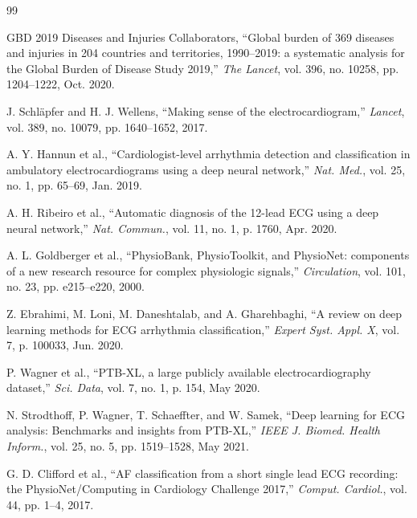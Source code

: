 \documentclass[12pt,a4paper]{report}
\begin{document}
\begin{thebibliography}{99}

GBD 2019 Diseases and Injuries Collaborators, ``Global burden of 369 diseases and injuries in 204 countries and territories, 1990--2019: a systematic analysis for the Global Burden of Disease Study 2019,'' \textit{The Lancet}, vol. 396, no. 10258, pp. 1204--1222, Oct. 2020.

J. Schläpfer and H. J. Wellens, ``Making sense of the electrocardiogram,'' \textit{Lancet}, vol. 389, no. 10079, pp. 1640--1652, 2017.

A. Y. Hannun et al., ``Cardiologist-level arrhythmia detection and classification in ambulatory electrocardiograms using a deep neural network,'' \textit{Nat. Med.}, vol. 25, no. 1, pp. 65--69, Jan. 2019.

A. H. Ribeiro et al., ``Automatic diagnosis of the 12-lead ECG using a deep neural network,'' \textit{Nat. Commun.}, vol. 11, no. 1, p. 1760, Apr. 2020.

A. L. Goldberger et al., ``PhysioBank, PhysioToolkit, and PhysioNet: components of a new research resource for complex physiologic signals,'' \textit{Circulation}, vol. 101, no. 23, pp. e215--e220, 2000.

Z. Ebrahimi, M. Loni, M. Daneshtalab, and A. Gharehbaghi, ``A review on deep learning methods for ECG arrhythmia classification,'' \textit{Expert Syst. Appl. X}, vol. 7, p. 100033, Jun. 2020.

P. Wagner et al., ``PTB-XL, a large publicly available electrocardiography dataset,'' \textit{Sci. Data}, vol. 7, no. 1, p. 154, May 2020.

N. Strodthoff, P. Wagner, T. Schaeffter, and W. Samek, ``Deep learning for ECG analysis: Benchmarks and insights from PTB-XL,'' \textit{IEEE J. Biomed. Health Inform.}, vol. 25, no. 5, pp. 1519--1528, May 2021.

G. D. Clifford et al., ``AF classification from a short single lead ECG recording: the PhysioNet/Computing in Cardiology Challenge 2017,'' \textit{Comput. Cardiol.}, vol. 44, pp. 1--4, 2017.


\end{thebibliography}
\end{document}
